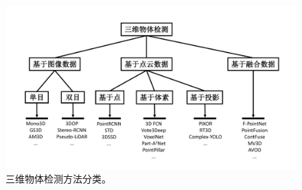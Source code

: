 \begin{figure}[h]
	\begin{center}
		\includegraphics[trim={1.5cm, 1.0cm, 1.5cm, 1.5cm}, clip, width=\textwidth]{imgs/det_algo.pdf}
	\end{center}
	\vspace{-0.8cm}
	\caption{三维物体检测方法分类。}
	\label{fig:det_algo}
\end{figure}
